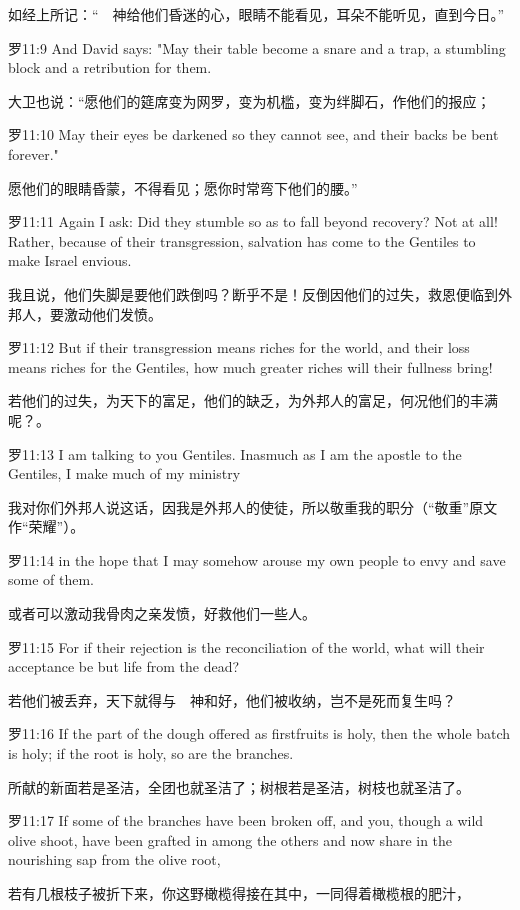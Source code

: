\documentclass[a4paper,11pt,onecolumn,twoside]{ctexart}
\begin{document}
\begin{multicols}{2}
 如经上所记：“　神给他们昏迷的心，眼睛不能看见，耳朵不能听见，直到今日。”


 罗11:9
 And David says: "May their table become a snare and a trap, a stumbling block and a retribution for them.

 大卫也说：“愿他们的筵席变为网罗，变为机槛，变为绊脚石，作他们的报应；


 罗11:10
 May their eyes be darkened so they cannot see, and their backs be bent forever."

 愿他们的眼睛昏蒙，不得看见；愿你时常弯下他们的腰。”


 罗11:11
 Again I ask: Did they stumble so as to fall beyond recovery? Not at all! Rather, because of their transgression, salvation has come to the Gentiles to make Israel envious.

 我且说，他们失脚是要他们跌倒吗？断乎不是！反倒因他们的过失，救恩便临到外邦人，要激动他们发愤。


 罗11:12
 But if their transgression means riches for the world, and their loss means riches for the Gentiles, how much greater riches will their fullness bring!

 若他们的过失，为天下的富足，他们的缺乏，为外邦人的富足，何况他们的丰满呢？。


 罗11:13
 I am talking to you Gentiles. Inasmuch as I am the apostle to the Gentiles, I make much of my ministry

 我对你们外邦人说这话，因我是外邦人的使徒，所以敬重我的职分（“敬重”原文作“荣耀”）。


 罗11:14
 in the hope that I may somehow arouse my own people to envy and save some of them.

 或者可以激动我骨肉之亲发愤，好救他们一些人。


 罗11:15
 For if their rejection is the reconciliation of the world, what will their acceptance be but life from the dead?

 若他们被丢弃，天下就得与　神和好，他们被收纳，岂不是死而复生吗？


 罗11:16
 If the part of the dough offered as firstfruits is holy, then the whole batch is holy; if the root is holy, so are the branches.

 所献的新面若是圣洁，全团也就圣洁了；树根若是圣洁，树枝也就圣洁了。


 罗11:17
 If some of the branches have been broken off, and you, though a wild olive shoot, have been grafted in among the others and now share in the nourishing sap from the olive root,

 若有几根枝子被折下来，你这野橄榄得接在其中，一同得着橄榄根的肥汁，



\end{multicols}
\end{document}
